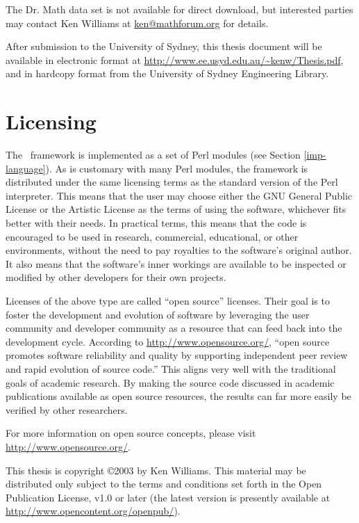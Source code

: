 The Dr. Math data set is not available for direct download, but
interested parties may contact Ken Williams at \url{ken@mathforum.org}
for details.

After submission to the University of Sydney, this thesis document
will be available in electronic format at
\url{http://www.ee.usyd.edu.au/~kenw/Thesis.pdf}, and in hardcopy
format from the University of Sydney Engineering Library.

\section*{Licensing}

The \aicat\ framework is implemented as a set of Perl modules (see
Section \ref{imp-language}).  As is customary with many Perl modules,
the framework is distributed under the same licensing terms as the
standard version of the Perl interpreter.  This means that the user
may choose either the GNU General Public License or the Artistic
License as the terms of using the software, whichever fits better with
their needs.  In practical terms, this means that the code is
encouraged to be used in research, commercial, educational, or other
environments, without the need to pay royalties to the software's
original author.  It also means that the software's inner workings are
available to be inspected or modified by other developers for their
own projects.

Licenses of the above type are called ``open source'' licenses.  Their
goal is to foster the development and evolution of software by
leveraging the user community and developer community as a resource
that can feed back into the development cycle.  According to
\url{http://www.opensource.org/}, ``open source promotes software
reliability and quality by supporting independent peer review and
rapid evolution of source code.''  This aligns very well with the
traditional goals of academic research.  By making the source code
discussed in academic publications available as open source resources, the
results can far more easily be verified by other researchers.

For more information on open source concepts, please visit
\url{http://www.opensource.org/}.

This thesis is copyright \copyright 2003 by Ken Williams. This
material may be distributed only subject to the terms and conditions
set forth in the Open Publication License, v1.0 or later (the latest
version is presently available at
\url{http://www.opencontent.org/openpub/}).

